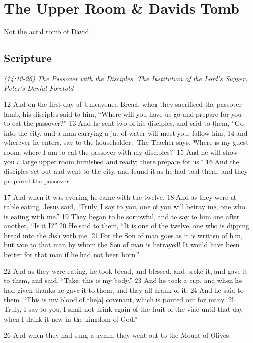 \documentclass[letterpaper]{report}
\begin{document}
\clearpage
\section{The Upper Room \& Davids Tomb}
\begin{multicols}{2}
  Not the actal tomb of David
\end{multicols}
\subsection{Scripture}

{\centering
	\emph{(14:12-26) The Passover with the Disciples,
		The Institution of the Lord’s Supper,
		Peter’s Denial Foretold}\\
}
\begin{multicols}{2}
12 And on the first day of Unleavened Bread, when they sacrificed the passover lamb, his disciples said to him, “Where will you have us go and prepare for you to eat the passover?” 13 And he sent two of his disciples, and said to them, “Go into the city, and a man carrying a jar of water will meet you; follow him, 14 and wherever he enters, say to the householder, ‘The Teacher says, Where is my guest room, where I am to eat the passover with my disciples?’ 15 And he will show you a large upper room furnished and ready; there prepare for us.” 16 And the disciples set out and went to the city, and found it as he had told them; and they prepared the passover.

17 And when it was evening he came with the twelve. 18 And as they were at table eating, Jesus said, “Truly, I say to you, one of you will betray me, one who is eating with me.” 19 They began to be sorrowful, and to say to him one after another, “Is it I?” 20 He said to them, “It is one of the twelve, one who is dipping bread into the dish with me. 21 For the Son of man goes as it is written of him, but woe to that man by whom the Son of man is betrayed! It would have been better for that man if he had not been born.”

22 And as they were eating, he took bread, and blessed, and broke it, and gave it to them, and said, “Take; this is my body.” 23 And he took a cup, and when he had given thanks he gave it to them, and they all drank of it. 24 And he said to them, “This is my blood of the[a] covenant, which is poured out for many. 25 Truly, I say to you, I shall not drink again of the fruit of the vine until that day when I drink it new in the kingdom of God.”

26 And when they had sung a hymn, they went out to the Mount of Olives.
\end{multicols}
\end{document}
